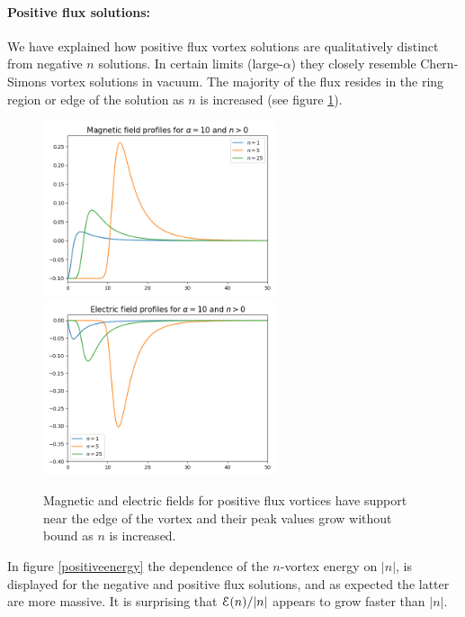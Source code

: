 \paragraph{Positive flux solutions:}
We have explained how positive flux vortex solutions are qualitatively distinct from negative $n$ solutions. In certain limits (large-$\alpha$) they closely resemble  Chern-Simons vortex solutions in vacuum. 
The majority of the flux resides in the ring region or edge of the solution as $n$ is increased (see figure \ref{positiveprofile}).
\begin{figure}[H]
\begin{center}
 \includegraphics[width=2.7in]{Chapter_2_Folder_1912.11321/figures/B_alpha_10_positive_final.png} \includegraphics[width=2.7in]{Chapter_2_Folder_1912.11321/figures/E_alpha_10_positive_final.png}
     \caption[\textcolor{red}{This figure depicts the magnetic and electric field profiles for positive flux.}]{{Magnetic and electric fields for positive flux vortices have support near the edge of the vortex and their peak values grow without bound as $n$ is increased.}} \label{positiveprofile}
    \end{center}
\end{figure} 
In figure \ref{positiveenergy} the dependence of the $n$-vortex energy on $|n|$, is displayed for the negative and positive flux solutions, and as expected the latter are more massive.  It is surprising  that ${\cal E }(n)/|n|$ appears to grow faster than $|n|$.
